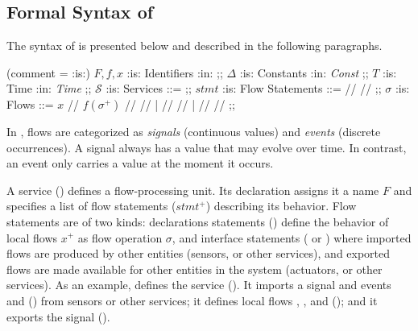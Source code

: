 \subsection{Formal Syntax of \GRFRP}
\label{sec:semantics:grfrp:syntax}

The syntax of \GRFRP is presented below and described in the following paragraphs.

\begin{center}
    \begin{bnf}(comment = {:is:})
        $F, f, x$     :is: Identifiers      :in: \idSet ;;
        $\Delta$      :is: Constants        :in: \textit{Const} ;;
        $T$           :is: Time             :in: \textit{Time} ;;
        $\mathcal{S}$ :is: Services         ::=   ;;
        $stmt$        :is: Flow Statements  ::=   //  //  ;;
        $\sigma$      :is: Flows            ::=  $x$ // $f(\sigma^+)$ // \onchange{\sigma} // \persist{\sigma}
        | //  // 
        | \mergeop{\sigma}{\sigma} // \throttle{\sigma}{\Delta} // \timeop ;;
    \end{bnf}
\end{center}

In \GRFRP, flows are categorized as \emph{signals} (continuous values) and \emph{events} (discrete
occurrences). A signal always has a value that may evolve over time. In contrast, an event only
carries a value at the moment it occurs.

A service () defines a flow-processing unit. Its declaration assigns it a name
$F$ and specifies a list of flow statements ($stmt^+$) describing its behavior.
%
Flow statements are of two kinds: declarations statements () define the behavior
of local flows $x^+$ as flow operation $\sigma$, and interface statements ( or )
where imported flows are produced by other entities (sensors, or other services), and exported flows
are made available for other entities in the system (actuators, or other services).
%
As an example,  defines the  service
(). It imports a signal  and events
 and 
() from sensors or other services; it
defines local flows , , and 
(); and it exports the signal 
().

